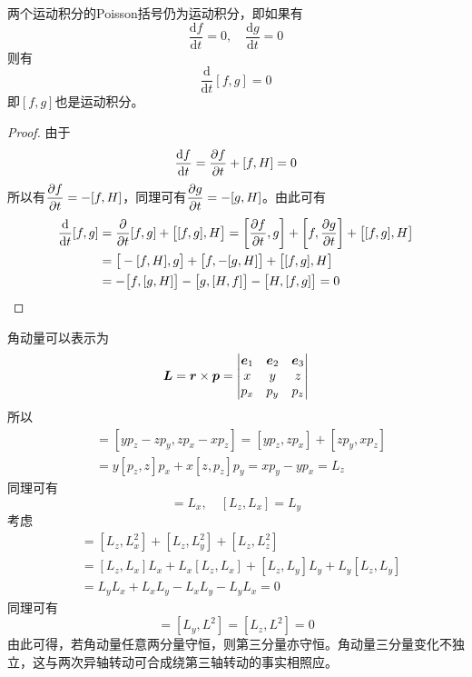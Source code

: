 \begin{theorem}[Poisson定理]
两个运动积分的Poisson括号仍为运动积分，即如果有
\begin{equation}
	\dfrac{\mathrm{d} f}{\mathrm{d} t} = 0,\quad \dfrac{\mathrm{d} g}{\mathrm{d} t} = 0
\end{equation}
则有
\begin{equation}
	\frac{\mathrm{d}}{\mathrm{d} t} [f,g] = 0
\end{equation}
即$[f,g]$也是运动积分。
\end{theorem}
\begin{proof}
由于
\begin{equation*}
	\frac{\mathrm{d} f}{\mathrm{d} t} = \frac{\partial f}{\partial t} + [f,H] = 0
\end{equation*}
所以有$\dfrac{\partial f}{\partial t} = -[f,H]$，同理可有$\dfrac{\partial g}{\partial t} = -[g,H]$。由此可有
\begin{align*}
	\frac{\mathrm{d}}{\mathrm{d} t} [f,g] & = \frac{\partial}{\partial t}[f,g] + \big[[f,g],H\big] = \left[\frac{\partial f}{\partial t},g\right] + \left[f,\frac{\partial g}{\partial t}\right] + \big[[f,g],H\big] \\
	& = \big[-[f,H],g\big] + \big[f,-[g,H]\big] + \big[[f,g],H\big] \\
	& = -\big[f,[g,H]\big] - \big[g,[H,f]\big] - \big[H,[f,g]\big] = 0 \qedhere
\end{align*}
\end{proof}

\begin{example}[角动量的Poisson括号]\label{chapter9:角动量的Poisson括号}
角动量可以表示为
\begin{equation*}
	\boldsymbol{L} = \boldsymbol{r} \times \boldsymbol{p} = \begin{vmatrix} \boldsymbol{e}_1 & \boldsymbol{e}_2 & \boldsymbol{e}_3 \\ x & y & z \\ p_x & p_y & p_z \end{vmatrix}
\end{equation*}
所以
\begin{align*}
	[L_x,L_y] & = [yp_z-zp_y,zp_x-xp_z] = [yp_z,zp_x] + [zp_y,xp_z] \\
	& = y[p_z,z]p_x + x[z,p_z] p_y = xp_y-yp_x = L_z
\end{align*}
同理可有
\begin{equation*}
	[L_y,L_z] = L_x,\quad [L_z,L_x] = L_y
\end{equation*}
考虑
\begin{align*}
	[L_z,L^2] & = [L_z,L_x^2] + [L_z,L_y^2] + [L_z,L_z^2] \\
	& = [L_z,L_x]L_x + L_x[L_z,L_x] + [L_z,L_y]L_y + L_y[L_z,L_y] \\
	& = L_yL_x + L_xL_y - L_xL_y - L_yL_x = 0
\end{align*}
同理可有
\begin{equation*}
	[L_x,L^2] = [L_y,L^2] = [L_z,L^2] = 0
\end{equation*}
由此可得，若角动量任意两分量守恒，则第三分量亦守恒。角动量三分量变化不独立，这与两次异轴转动可合成绕第三轴转动的事实相照应。
\end{example}

